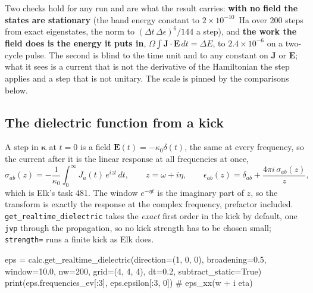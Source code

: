 \documentclass[11pt,a4paper]{article}
\newcommand{\code}[1]{\texttt{\small #1}}
\begin{document}
Two checks hold for any run and are what the result carries:
\textbf{with no field the states are stationary} (the band energy constant to
$2\times10^{-10}$~Ha over 200 steps from exact eigenstates, the norm to
$(\Delta t\,\Delta\epsilon)^6/144$ a step), and \textbf{the work the field does is
the energy it puts in}, $\Omega\int\mathbf J\cdot\mathbf E\,dt = \Delta E$, to
$2.4\times10^{-6}$ on a two-cycle pulse. The second is blind to the time unit
and to any constant on $\mathbf J$ or $\mathbf E$; what it sees is a current
that is not the derivative of the Hamiltonian the step applies and a step that
is not unitary. The scale is pinned by the comparisons below.

\subsection{The dielectric function from a kick}

A step in $\boldsymbol\kappa$ at $t=0$ is a field $\mathbf E(t) =
-\kappa_0\delta(t)$, the same at every frequency, so the current after it is the
linear response at all frequencies at once,
\begin{equation*}
\sigma_{ab}(z) = -\frac{1}{\kappa_0}\int_0^\infty J_a(t)\,e^{izt}\,dt,
\qquad z = \omega + i\eta, \qquad
\epsilon_{ab}(z) = \delta_{ab} + \frac{4\pi i\,\sigma_{ab}(z)}{z},
\end{equation*}
which is Elk's task 481. The window $e^{-\eta t}$ is the imaginary part of $z$,
so the transform is exactly the response at the complex frequency, prefactor
included. \code{get\_realtime\_dielectric} takes the \emph{exact} first order in
the kick by default, one \code{jvp} through the propagation, so no kick strength
has to be chosen small; \code{strength=} runs a finite kick as Elk does.

\begin{pycode}
eps = calc.get_realtime_dielectric(direction=(1, 0, 0), broadening=0.5,
                                   window=10.0, nw=200, grid=(4, 4, 4), dt=0.2,
                                   subtract_static=True)
print(eps.frequencies_ev[:3], eps.epsilon[:3, 0])   # eps_xx(w + i eta)
\end{pycode}
\end{document}
